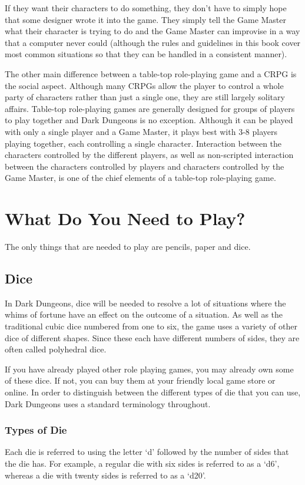 \begin{multicols*}{2}
If they want their characters to do something, they don’t have to simply hope that some designer wrote it into the game. They simply tell the Game Master what their character is trying to do and the Game Master can improvise in a way that a computer never could (although the rules and guidelines in this book cover most common situations so that they can be handled in a consistent manner).

The other main difference between a table-top role-playing game and a CRPG is the social aspect. Although many CRPGs allow the player to control a whole party of characters rather than just a single one, they are still largely solitary affairs. Table-top role-playing games are generally designed for groups of players to play together and Dark Dungeons is no exception. Although it can be played with only a single player and a Game Master, it plays best with 3-8 players playing together, each controlling a single character. Interaction between the characters controlled by the different players, as well as non-scripted interaction between the characters controlled by players and characters controlled by the Game Master, is one of the chief elements of a table-top role-playing game.

\section{What Do You Need to Play?}
The only things that are needed to play are pencils, paper and dice.

\subsection{Dice}
In Dark Dungeons, dice will be needed to resolve a lot of situations where the whims of fortune have an effect on the outcome of a situation. As well as the traditional cubic dice numbered from one to six, the game uses a variety of other dice of different shapes. Since these each have different numbers of sides, they are often called polyhedral dice.

If you have already played other role playing games, you may already own some of these dice. If not, you can buy them at your friendly local game store or online. In order to distinguish between the different types of die that you can use, Dark Dungeons uses a standard terminology throughout.

\subsubsection{Types of Die}
Each die is referred to using the letter ‘d’ followed by the number of sides that the die has. For example, a regular die with six sides is referred to as a ‘d6’, whereas a die with twenty sides is referred to as a ‘d20’.


\end{multicols*}
